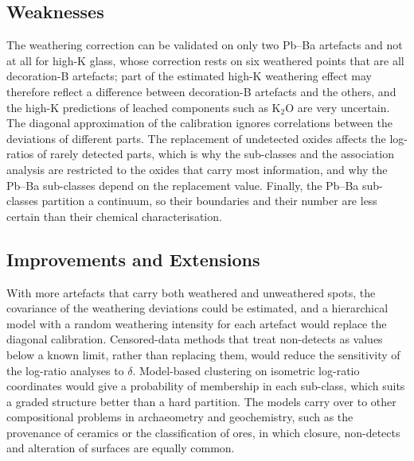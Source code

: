 \documentclass[11pt,a4paper]{article}
\newcommand{\ox}[1]{\ensuremath{\mathrm{#1}}}
\begin{document}
\subsection{Weaknesses}
The weathering correction can be validated on only two Pb--Ba artefacts and not at all for high-K glass, whose correction rests on six weathered points that are all decoration-B artefacts; part of the estimated high-K weathering effect may therefore reflect a difference between decoration-B artefacts and the others, and the high-K predictions of leached components such as \ox{K_2O} are very uncertain.
The diagonal approximation of the calibration ignores correlations between the deviations of different parts.
The replacement of undetected oxides affects the log-ratios of rarely detected parts, which is why the sub-classes and the association analysis are restricted to the oxides that carry most information, and why the Pb--Ba sub-classes depend on the replacement value.
Finally, the Pb--Ba sub-classes partition a continuum, so their boundaries and their number are less certain than their chemical characterisation.

\subsection{Improvements and Extensions}
With more artefacts that carry both weathered and unweathered spots, the covariance of the weathering deviations could be estimated, and a hierarchical model with a random weathering intensity for each artefact would replace the diagonal calibration.
Censored-data methods that treat non-detects as values below a known limit, rather than replacing them, would reduce the sensitivity of the log-ratio analyses to $\delta$.
Model-based clustering on isometric log-ratio coordinates would give a probability of membership in each sub-class, which suits a graded structure better than a hard partition.
The models carry over to other compositional problems in archaeometry and geochemistry, such as the provenance of ceramics or the classification of ores, in which closure, non-detects and alteration of surfaces are equally common.

\end{document}
